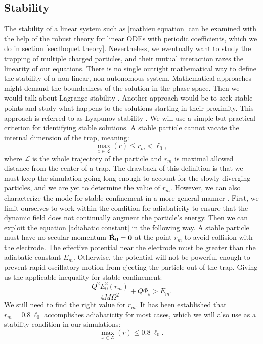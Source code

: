 \subsection{Stability} 
The stability of a linear system such as \eqref{mathieu equation} can be examined with the help of the robust theory for linear ODEs with periodic coefficients, which we do in section \ref{sec:floquet theory}. Nevertheless, we eventually want to study the trapping of multiple charged particles, and their mutual interaction razes the linearity of our equations. There is no single outright mathematical way to define the stability of a non-linear, non-autonomous system. Mathematical approaches might demand the boundedness of the solution in the phase space. Then we would talk about Lagrange stability \cite{bhatia2002stability}. Another approach would be to seek stable points and study what happens to the solutions starting in their proximity. This approach is referred to as Lyapunov stability \cite{lyapunov1992general}. We will use a simple but practical criterion for identifying stable solutions. A stable particle cannot vacate the internal dimension of the trap, meaning:
\begin{equation}
	\max\limits_{x \in \mathcal{L}}(r) \leq r_m < \ell_0,
\end{equation}
where $\mathcal{L}$ is the whole trajectory of the particle and $r_m$ is maximal allowed distance from the center of a trap. The drawback of this definition is that we must keep the simulation going long enough to account for the slowly diverging particles, and we are yet to determine the value of $r_m$. However, we can also characterize the mode for stable confinement in a more general manner \cite{gerlich1992inhomogeneous}. First, we limit ourselves to work within the condition for adiabaticity to ensure that the dynamic field does not continually augment the particle's energy. Then we can exploit the equation \eqref{adiabatic constant} in the following way. A stable particle must have no secular momentum $\vb{\dot{R}_0} = \vb{0}$ at the point $r_m$ to avoid collision with the electrode. The effective potential near the electrode must be greater than the adiabatic constant $E_m$. Otherwise, the potential will not be powerful enough to prevent rapid oscillatory motion from ejecting the particle out of the trap. Giving us the applicable inequality for stable confinement:
\begin{equation}
	\label{stability condition inequality}
	\dfrac{Q^2 E_0^2(r_m)}{4 M \Omega^2} + Q\Phi_s > E_m.
\end{equation}
We still need to find the right value for $r_m$. It has been established \cite{gerlich1992inhomogeneous} that $r_m = 0.8 \ \ell_0$ accomplishes adiabaticity for most cases, which we will also use as a stability condition in our simulations:
\begin{equation}
	\label{stability condition in simulation}
	\max\limits_{x \in \mathcal{L}}(r) \leq 0.8 \ \ell_0.
\end{equation}

